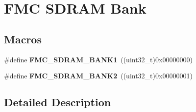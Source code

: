 \hypertarget{group___f_m_c___s_d_r_a_m___bank}{}\section{F\+MC S\+D\+R\+AM Bank}
\label{group___f_m_c___s_d_r_a_m___bank}
\subsection*{Macros}
\begin{DoxyCompactItemize}
\item 
\#define {\bfseries F\+M\+C\+\_\+\+S\+D\+R\+A\+M\+\_\+\+B\+A\+N\+K1}~((uint32\+\_\+t)0x00000000)\hypertarget{group___f_m_c___s_d_r_a_m___bank_ga16cd8f57889d0d38ab07a21e7a0075a8}{}\label{group___f_m_c___s_d_r_a_m___bank_ga16cd8f57889d0d38ab07a21e7a0075a8}

\item 
\#define {\bfseries F\+M\+C\+\_\+\+S\+D\+R\+A\+M\+\_\+\+B\+A\+N\+K2}~((uint32\+\_\+t)0x00000001)\hypertarget{group___f_m_c___s_d_r_a_m___bank_ga8006b2913c143929ed0e5bd4c38aa7e9}{}\label{group___f_m_c___s_d_r_a_m___bank_ga8006b2913c143929ed0e5bd4c38aa7e9}

\end{DoxyCompactItemize}


\subsection{Detailed Description}
